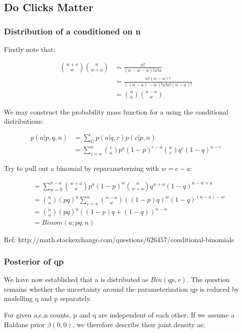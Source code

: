 \documentclass[11pt,a4,singlespacing,titlepagenumber=on]{scrreprt}
\numberwithin{equation}{chapter} %
\theoremstyle{remark}
\begin{document}
\subsection{Do Clicks Matter}

\subsubsection{Distribution of a conditioned on n}

Firstly note that:

\begin{align}
{w+a \choose w}{n \choose w+a} &= \frac{n!}{(n-w-a)!w!a} \\
	&= \frac{n!(n-a)!}{((n-a)-w)!w!a!(n-a)!} \\
	&=  {n \choose a}{n-a \choose w}
\end{align}

We may construct the probability mass function for a using the conditional distributions:

\begin{align}
p(a|p,q,n) &= \sum_C p(a|q,c)p(c|p,n) \\
 &= \sum_{c=a}^n {c \choose a} p^a(1-p)^{c-a} {n \choose c} q^c (1-q)^{n-c}
\end{align}

Try to pull out a binomial by reparameterizing with $ w = c-a$:

\begin{align}
&= \sum_{w=0}^{n-a} {w+a \choose a} p^a(1-p)^w {n \choose w+a} q^{w+a} (1-q)^{n-w+a} \\
&= {n \choose a} (pq)^a \sum_{c=a}^n {n-a \choose w} ((1-p)q)^w (1-q)^{(n-a)-w} \\
&= {n \choose a} (pq)^a ((1-p)q +  (1-q))^{n-a} \\
&= Binom(a;pq,n)
\end{align}

Ref: http://math.stackexchange.com/questions/626457/conditional-binomials

\subsubsection{Posterior of qp}

We have now established that a is distributed as $Bin(qp,v)$. The question remains whether the uncertainty around the parameterization qp is reduced by modelling q and p separately.

For given a,c,n counts, p and q are independent of each other. If we assume a Haldane prior $\beta(0,0)$, we therefore describe their joint density as:
\end{document}
